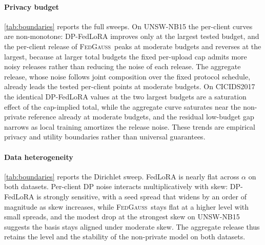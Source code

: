 \documentclass[a4paper,fleqn]{cas-dc}
\newcommand{\method}{\textsc{FedGauss}}
\begin{document}
\par
\par
\paragraph{Privacy budget} \cref{tab:boundaries} reports the full sweeps. On UNSW-NB15 the
per-client curves are non-monotone: DP-FedLoRA improves only at the largest
tested budget, and the per-client release of \method\ peaks at moderate
budgets and reverses at the largest, because at larger total budgets the
fixed per-upload cap admits more noisy releases rather than reducing the
noise of each release. The aggregate release, whose noise follows joint
composition over the fixed protocol schedule, already leads the tested
per-client points at moderate budgets. On CICIDS2017 the identical
DP-FedLoRA values at the two largest budgets are a saturation effect of the
cap-implied total, while the aggregate curve saturates near the non-private
reference already at moderate budgets, and the residual low-budget gap
narrows as local training amortizes the release noise. These trends are empirical privacy and utility boundaries
rather than universal guarantees.
\par
\paragraph{Data heterogeneity} \cref{tab:boundaries} reports the Dirichlet sweep. FedLoRA is nearly
flat across $\alpha$ on both datasets. Per-client DP noise interacts
multiplicatively with skew: DP-FedLoRA is strongly sensitive, with a
seed spread that widens by an order of magnitude as skew increases, while
\method\ stays flat at a higher level with small spreads, and the modest
drop at the strongest skew on UNSW-NB15 suggests the basis stays aligned
under moderate skew. The aggregate release thus retains the level and the
stability of the non-private model on both datasets.
\par
\end{document}
